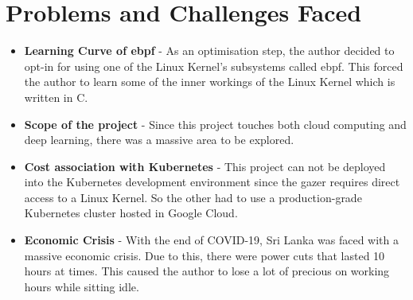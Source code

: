 \section{Problems and Challenges Faced}

\begin{itemize}[noitemsep,nolistsep]
    \item \textbf{Learning Curve of \ac{ebpf}} - As an optimisation step, the author decided to opt-in for using one of the Linux Kernel's subsystems called \ac{ebpf}. This forced the author to learn some of the inner workings of the Linux Kernel which is written in C.
    \item \textbf{Scope of the project} - Since this project touches both cloud computing and deep learning, there was a massive area to be explored.
    \item \textbf{Cost association with Kubernetes} - This project can not be deployed into the Kubernetes development environment since the \ac{gazer} requires direct access to a Linux Kernel. So the other had to use a production-grade Kubernetes cluster hosted in Google Cloud.
    \item \textbf{Economic Crisis} - With the end of COVID-19, Sri Lanka was faced with a massive economic crisis. Due to this, there were power cuts that lasted 10 hours at times. This caused the author to lose a lot of precious on working hours while sitting idle.
\end{itemize}